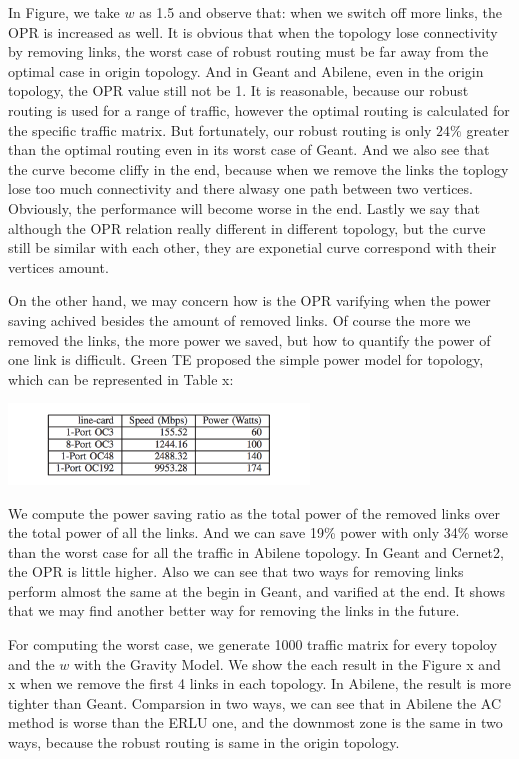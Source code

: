\documentclass[conference]{IEEEtran}
\begin{document}
In Figure, we take $w$ as 1.5 and observe that: when we switch off more links, the OPR is increased as well. 
It is obvious that when the topology
lose connectivity by removing links, the worst case of robust routing must be far away from the optimal case in origin topology. And
in Geant and Abilene, even in the origin topology, the OPR value still not be 1. It is reasonable, because our robust routing 
is used for a range of traffic, however the optimal routing is calculated for the specific traffic matrix. But fortunately, our robust
routing is only $24\%$ greater than the optimal routing even in its worst case of Geant. And we also see that the curve become 
cliffy in the end, because when we remove the links the toplogy lose too much connectivity and there alwasy one path between two vertices.
Obviously, the performance will become worse in the end. Lastly we say that although the OPR relation really different in different 
topology, but the curve still be similar with each other, they are exponetial curve correspond with their vertices amount.


On the other hand, we may concern how is the OPR varifying when the power saving achived besides the amount of removed links.
Of course the more we removed the links, the more power we saved, but how to quantify the power of one link is difficult. Green
TE proposed the simple power model for topology, which can be represented in Table x:

\vspace*{0.2in}
\includegraphics[width=8cm]{power_model}
\vspace*{0.2in}

We compute the power saving ratio as the total power of the removed links over the total power of all the links. And we can
save 19\% power with only 34\% worse than the worst case for all the traffic in Abilene topology. In Geant and Cernet2, 
the OPR is little higher. Also we can see that two ways for removing links perform almost the same at the begin in Geant,
and varified at the end. It shows that we may find another better way for removing the links in the future.


For computing the worst case, we generate 1000 traffic matrix for every topoloy and the $w$ with the Gravity Model.
We show the each result in the Figure x and x when we remove the first 4 links in each topology. In Abilene, the result 
is more tighter than Geant. Comparsion in two ways, we can see that in Abilene the AC method is worse than the ERLU one,
and the downmost zone is the same in two ways, because the robust routing is same in the origin topology.
\end{document}
